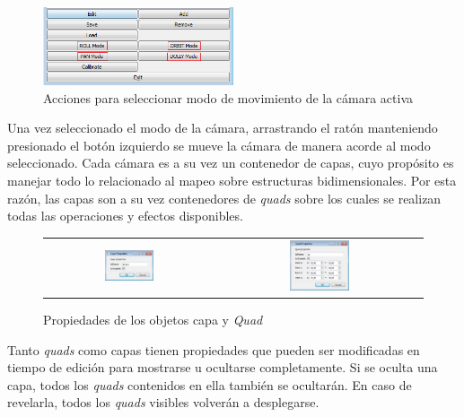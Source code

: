 \begin{figure}[H]
  \centering
    \includegraphics[width=0.5\textwidth]{./Cap5_vmt/vmt_SceneBotonera.png}
  \caption[Imagen propia.]{Acciones para seleccionar modo de movimiento de la cámara activa}
  \label{fig:VMT-CameraActions}
\end{figure}

Una vez seleccionado el modo de la cámara, arrastrando el ratón manteniendo presionado el botón izquierdo se mueve la cámara de manera acorde al modo seleccionado.
Cada cámara es a su vez un contenedor de capas, cuyo propósito es manejar todo lo relacionado al mapeo sobre estructuras bidimensionales. Por esta razón, las capas son a su vez contenedores de \emph{quads} sobre los cuales se realizan todas las operaciones y efectos disponibles.

\begin{figure}
	\begin{center}
		\begin{tabular}[c]{cc}
			\includegraphics[width=0.3\textwidth]{./Cap5_vmt/vmt_layerProperties.png}
				&        
			\includegraphics[width=0.3\textwidth]{./Cap5_vmt/vmt_quadProperties.png}
		\end{tabular}
	\end{center}
	\caption[Imagen propia.]{Propiedades de los objetos capa y \emph{Quad}}
	\label{fig:VMT-LayerQuadProperties}
\end{figure}

Tanto \emph{quads} como capas tienen propiedades que pueden ser modificadas en tiempo de edición para mostrarse u ocultarse completamente. Si se oculta una capa, todos los \emph{quads} contenidos en ella también se ocultarán. En caso de revelarla, todos los \emph{quads} visibles volverán a desplegarse.

